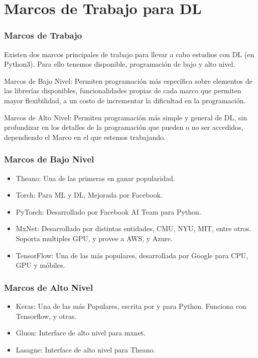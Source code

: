 \documentclass[9pt, xcolor=svgnames, dvipsnames]{beamer}
\begin{document}
\section{Marcos de Trabajo para DL}

\begin{frame}[fragile]
\frametitle{Marcos de Trabajo}
Existen dos marcos principales de trabajo para llevar a cabo estudios con DL (en Python3). Para ello tenemos disponible, programaci\'on de bajo y alto nivel.

\begin{tcolorbox}
Marcos de Bajo Nivel: Permiten programaci\'on m\'as espec\'ifica sobre elementos de las librer\'ias disponibles, funcionalidades propias de cada marco que permiten mayor flexibilidad, a un costo de incrementar la dificultad en la programaci\'on.
\end{tcolorbox}

\begin{tcolorbox}
Marcos de Alto Nivel: Permiten programaci\'on m\'as simple y general de DL, sin profundizar en los detalles de la programaci\'on que pueden o no ser accedidos, dependiendo el Marco en el que estemos trabajando.
\end{tcolorbox}
\end{frame}

\begin{frame}[fragile]
\frametitle{Marcos de Bajo Nivel}
\begin{itemize}
    \item Theano: Una de las primeras en ganar popularidad.
    \item Torch: Para ML y DL, Mejorada por Facebook.
    \item PyTorch: Desarrollado por Facebook AI Team para Python.
    \item MxNet: Desarrollado por distintas entidades, CMU, NYU, MIT, entre otros. Soporta multiples GPU, y provee a AWS, y Azure.
    \item TensorFlow: Una de las m\'as populares, desarrollada por Google para CPU, GPU y m\'obiles.
\end{itemize}    
\end{frame}

\begin{frame}[fragile]
\frametitle{Marcos de Alto Nivel}
\begin{itemize}
    \item Keras: Una de las m\'as Populares, escrita por y para Python. Funciona con Tensorflow, y otras.
    \item Gluon: Interface de alto nivel para mxnet.
    \item Lasagne: Interface de alto nivel para Theano.
\end{itemize}    
\end{frame}
\end{document}
